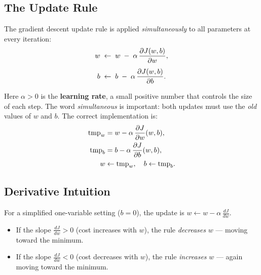 \subsection{The Update Rule}

The gradient descent update rule is applied \emph{simultaneously} to all
parameters at every iteration:
\begin{align}
w &\;\leftarrow\; w \;-\; \alpha\,\dfrac{\partial J(w,b)}{\partial w},\label{eq:gd-w}\\[4pt]
b &\;\leftarrow\; b \;-\; \alpha\,\dfrac{\partial J(w,b)}{\partial b}.\label{eq:gd-b}
\end{align}

Here $\alpha > 0$ is the \textbf{learning rate}, a small positive number that
controls the size of each step. The word \emph{simultaneous} is important: both
updates must use the \emph{old} values of $w$ and $b$. The correct implementation is:
\begin{align*}
\mathrm{tmp}_w &= w - \alpha\,\dfrac{\partial J}{\partial w}(w,b),\\
\mathrm{tmp}_b &= b - \alpha\,\dfrac{\partial J}{\partial b}(w,b),\\
w &\leftarrow \mathrm{tmp}_w,\quad b \leftarrow \mathrm{tmp}_b.
\end{align*}

\subsection{Derivative Intuition}

For a simplified one-variable setting ($b=0$), the update is
$w \leftarrow w - \alpha\,\tfrac{dJ}{dw}$.

\begin{itemize}
\item If the slope $\tfrac{dJ}{dw}>0$ (cost increases with $w$), the rule
  \emph{decreases} $w$ — moving toward the minimum.
\item If the slope $\tfrac{dJ}{dw}<0$ (cost decreases with $w$), the rule
  \emph{increases} $w$ — again moving toward the minimum.
\end{itemize}

